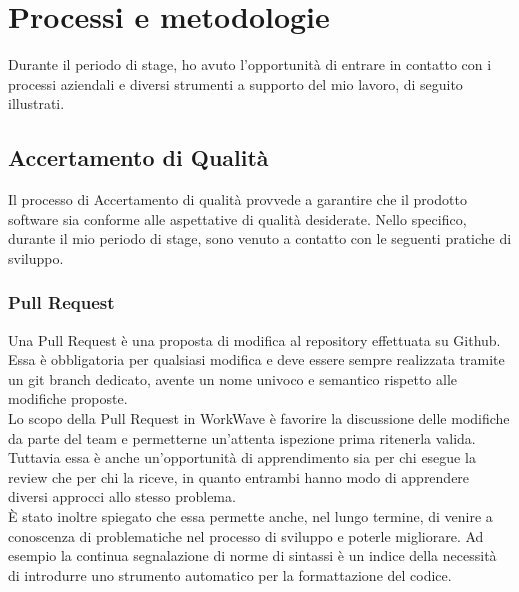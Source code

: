 
\chapter{Processi e metodologie}
\label{cap:processi-metodologie}

Durante il periodo di stage, ho avuto l'opportunità di entrare in contatto con i processi aziendali e diversi strumenti a supporto del mio lavoro, di seguito illustrati.

\section{Accertamento di Qualità}

Il processo di Accertamento di qualità provvede a garantire che il prodotto software sia conforme alle aspettative di qualità desiderate. Nello specifico, durante il mio periodo di stage, sono venuto a contatto con le seguenti pratiche di sviluppo.

\subsection{Pull Request}

Una Pull Request è una proposta di modifica al repository effettuata su Github. Essa è obbligatoria per qualsiasi modifica e deve essere sempre realizzata tramite un git branch dedicato, avente un nome univoco e semantico rispetto alle modifiche proposte. \\

Lo scopo della Pull Request in WorkWave è favorire la discussione delle modifiche da parte del team e permetterne un'attenta ispezione prima ritenerla valida. Tuttavia essa è anche un'opportunità di apprendimento sia per chi esegue la review che per chi la riceve, in quanto entrambi hanno modo di apprendere diversi approcci allo stesso problema. \\

È stato inoltre spiegato che essa permette anche, nel lungo termine, di venire a conoscenza di problematiche nel processo di sviluppo e poterle migliorare. Ad esempio la continua segnalazione di norme di sintassi è un indice della necessità di introdurre uno strumento automatico per la formattazione del codice.

